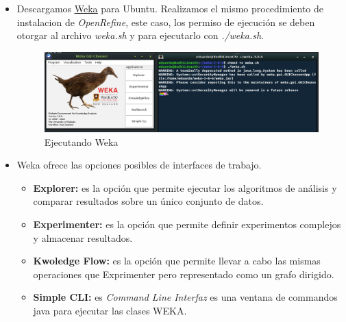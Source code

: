 \documentclass[12pt]{article}
\begin{document}
                \begin{itemize}
                    \item Descargamos \href{https://waikato.github.io/weka-wiki/downloading_weka/}{\uline{Weka}} para Ubuntu. Realizamos el mismo procedimiento de instalacion de \textit{OpenRefine}, este caso, los permiso de ejecución se deben otorgar al archivo \textit{weka.sh} y para ejecutarlo con \textit{./weka.sh}.
                        \begin{figure}[!h]
                            \centering
                            \includegraphics[width=1\textwidth]{img/weka-1.png}
                            \caption{Ejecutando Weka}
                        \end{figure}
                    
                    \item Weka ofrece las opciones posibles de interfaces de trabajo. 
                        \begin{itemize}
                            \item \textbf{Explorer:} es la opción que permite ejecutar los algoritmos de análisis y comparar resultados sobre un único conjunto de datos.
                            \item \textbf{Experimenter:} es la opción que permite definir experimentos complejos y almacenar resultados.
                            \item \textbf{Kwoledge Flow:} es la opción que permite llevar a cabo las mismas operaciones que Exprimenter pero representado como un grafo dirigido.
                            \item \textbf{Simple CLI:} es \textit{Command Line Interfaz} es una ventana de commandos java para ejecutar las clases WEKA.
                        \end{itemize}


\end{itemize}
\end{document}
